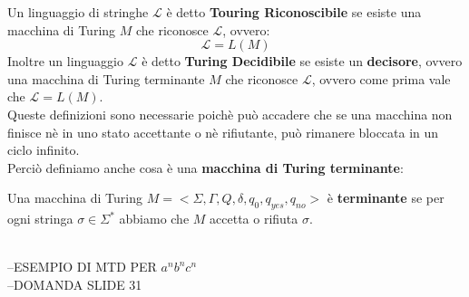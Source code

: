 \noindent Un linguaggio di stringhe $\mathcal{L}$ è detto \textbf{Touring Riconoscibile} se esiste una macchina di Turing $M$ che riconosce $\mathcal{L}$,
ovvero:
\[  \mathcal{L} = L(M)    \]
Inoltre un linguaggio $\mathcal{L}$ è detto \textbf{Turing Decidibile} se esiste un \textbf{decisore}, ovvero una macchina di Turing terminante $M$
che riconosce $\mathcal{L}$, ovvero come prima vale che $\mathcal{L} = L(M)$.\\
Queste definizioni sono necessarie poichè può accadere che se una macchina non finisce nè in uno stato accettante o nè rifiutante, può rimanere bloccata
in un ciclo infinito. \\Perciò definiamo anche cosa è una \textbf{macchina di Turing terminante}:\smallskip\\
\colorbox{SALZO}{\parbox{\dimexpr\linewidth-2\fboxsep}{\begin{definition}
   Una macchina di Turing $M = <\Sigma, \Gamma,Q,\delta,q_0,q_{yes},q_{no}>$ è \textbf{terminante} se per ogni stringa $\sigma \in \Sigma^*$ abbiamo che $M$ accetta o rifiuta $\sigma$.
\end{definition}}}\medskip\\

--ESEMPIO DI MTD PER $a^nb^nc^n$\\
--DOMANDA SLIDE 31


    